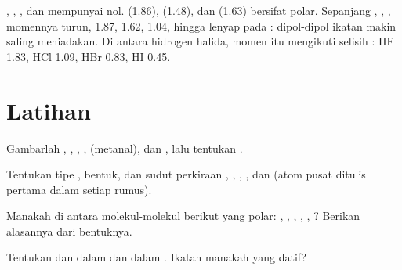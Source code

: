 \begin{example}\label{ex:b1:lewis-resonance-vsepr:dipoles}
, , , dan  mempunyai  nol.
 (\qty{1.86}{\debye}),  (\qty{1.48}{\debye}), dan
 (\qty{1.63}{\debye}) bersifat polar. Sepanjang ,
, , momennya turun, 1.87, 1.62, \qty{1.04}{\debye},
hingga lenyap pada : dipol-dipol ikatan  makin saling
meniadakan. Di antara hidrogen halida, momen itu mengikuti selisih
: HF 1.83, HCl 1.09, HBr 0.83, HI \qty{0.45}{\debye}.
\end{example}

\section{Latihan}

\begin{exercise}[$\star$]\label{exo:b1:lewis-resonance-vsepr:1}
Gambarlah  , , , ,
 (metanal), dan , lalu tentukan .
\end{exercise}

\begin{exercise}[$\star$]\label{exo:b1:lewis-resonance-vsepr:2}
Tentukan tipe , bentuk, dan sudut perkiraan ,
, , , dan  (atom pusat ditulis
pertama dalam setiap rumus).
\end{exercise}

\begin{exercise}[$\star$]\label{exo:b1:lewis-resonance-vsepr:3}
Manakah di antara molekul-molekul berikut yang polar: ,
, , , , ? Berikan alasannya
dari bentuknya.
\end{exercise}

\begin{exercise}[$\star$]\label{exo:b1:lewis-resonance-vsepr:4}
Tentukan  dan  dalam  dan dalam
. Ikatan manakah yang datif?
\end{exercise}

